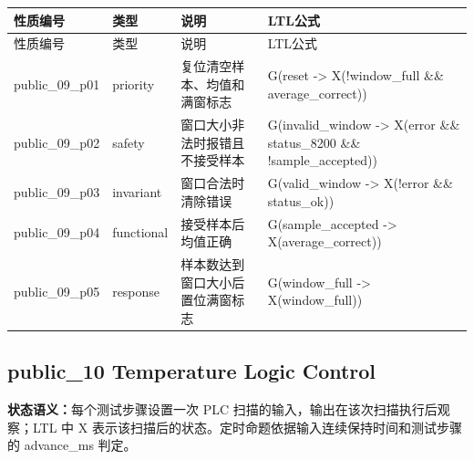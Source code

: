 \begin{longtable}{L{2.3cm}L{1.7cm}L{4.1cm}L{5.2cm}}

\toprule

性质编号 & 类型 & 说明 & LTL公式\\

\midrule

\endfirsthead

\toprule

性质编号 & 类型 & 说明 & LTL公式\\

\midrule

\endhead

{\ttfamily public\_09\_p01} & priority & 复位清空样本、均值和满窗标志 & {\ttfamily G(reset -> X(!window\_full \&\& average\_correct))}\\

{\ttfamily public\_09\_p02} & safety & 窗口大小非法时报错且不接受样本 & {\ttfamily G(invalid\_window -> X(error \&\& status\_8200 \&\& !sample\_accepted))}\\

{\ttfamily public\_09\_p03} & invariant & 窗口合法时清除错误 & {\ttfamily G(valid\_window -> X(!error \&\& status\_ok))}\\

{\ttfamily public\_09\_p04} & functional & 接受样本后均值正确 & {\ttfamily G(sample\_accepted -> X(average\_correct))}\\

{\ttfamily public\_09\_p05} & response & 样本数达到窗口大小后置位满窗标志 & {\ttfamily G(window\_full -> X(window\_full))}\\

\bottomrule

\end{longtable}

\subsection{{\ttfamily public\_10} Temperature Logic Control}

\noindent\textbf{状态语义：}每个测试步骤设置一次 PLC 扫描的输入，输出在该次扫描执行后观察；LTL 中 X 表示该扫描后的状态。定时命题依据输入连续保持时间和测试步骤的 advance\_ms 判定。

